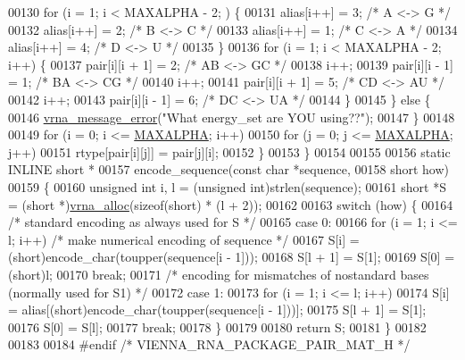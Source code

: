 \begin{DoxyCode}
00130       \textcolor{keywordflow}{for} (i = 1; i < MAXALPHA - 2; ) \{
00131         alias[i++]  = 3;    \textcolor{comment}{/* A <-> G */}
00132         alias[i++]  = 2;    \textcolor{comment}{/* B <-> C */}
00133         alias[i++]  = 1;    \textcolor{comment}{/* C <-> A */}
00134         alias[i++]  = 4;    \textcolor{comment}{/* D <-> U */}
00135       \}
00136       \textcolor{keywordflow}{for} (i = 1; i < MAXALPHA - 2; i++) \{
00137         pair[i][i + 1] = 2;     \textcolor{comment}{/* AB <-> GC */}
00138         i++;
00139         pair[i][i - 1] = 1;     \textcolor{comment}{/* BA <-> CG */}
00140         i++;
00141         pair[i][i + 1] = 5;     \textcolor{comment}{/* CD <-> AU */}
00142         i++;
00143         pair[i][i - 1] = 6;     \textcolor{comment}{/* DC <-> UA */}
00144       \}
00145     \} \textcolor{keywordflow}{else} \{
00146       \hyperlink{group__message__utils_ga36b35be01d7f36cf7f59c245eee628d1}{vrna\_message\_error}(\textcolor{stringliteral}{"What energy\_set are YOU using??"});
00147     \}
00148 
00149     \textcolor{keywordflow}{for} (i = 0; i <= \hyperlink{group__model__details_ga05a5ffe718aa431d97419a12fb082379}{MAXALPHA}; i++)
00150       \textcolor{keywordflow}{for} (j = 0; j <= \hyperlink{group__model__details_ga05a5ffe718aa431d97419a12fb082379}{MAXALPHA}; j++)
00151         rtype[pair[i][j]] = pair[j][i];
00152   \}
00153 \}
00154 
00155 
00156 \textcolor{keyword}{static} INLINE \textcolor{keywordtype}{short} *
00157 encode\_sequence(\textcolor{keyword}{const} \textcolor{keywordtype}{char}  *sequence,
00158                 \textcolor{keywordtype}{short}       how)
00159 \{
00160   \textcolor{keywordtype}{unsigned} \textcolor{keywordtype}{int}  i, l = (\textcolor{keywordtype}{unsigned} int)strlen(sequence);
00161   \textcolor{keywordtype}{short}         *S = (\textcolor{keywordtype}{short} *)\hyperlink{group__utils_gaf37a0979367c977edfb9da6614eebe99}{vrna\_alloc}(\textcolor{keyword}{sizeof}(\textcolor{keywordtype}{short}) * (l + 2));
00162 
00163   \textcolor{keywordflow}{switch} (how) \{
00164     \textcolor{comment}{/* standard encoding as always used for S */}
00165     \textcolor{keywordflow}{case} 0:
00166       \textcolor{keywordflow}{for} (i = 1; i <= l; i++)    \textcolor{comment}{/* make numerical encoding of sequence */}
00167         S[i] = (\textcolor{keywordtype}{short})encode\_char(toupper(sequence[i - 1]));
00168       S[l + 1]  = S[1];
00169       S[0]      = (short)l;
00170       \textcolor{keywordflow}{break};
00171     \textcolor{comment}{/* encoding for mismatches of nostandard bases (normally used for S1) */}
00172     \textcolor{keywordflow}{case} 1:
00173       \textcolor{keywordflow}{for} (i = 1; i <= l; i++)
00174         S[i] = alias[(\textcolor{keywordtype}{short})encode\_char(toupper(sequence[i - 1]))];
00175       S[l + 1]  = S[1];
00176       S[0]      = S[l];
00177       \textcolor{keywordflow}{break};
00178   \}
00179 
00180   \textcolor{keywordflow}{return} S;
00181 \}
00182 
00183 
00184 \textcolor{preprocessor}{#endif }\textcolor{comment}{/* VIENNA\_RNA\_PACKAGE\_PAIR\_MAT\_H */}\textcolor{preprocessor}{}
\end{DoxyCode}
